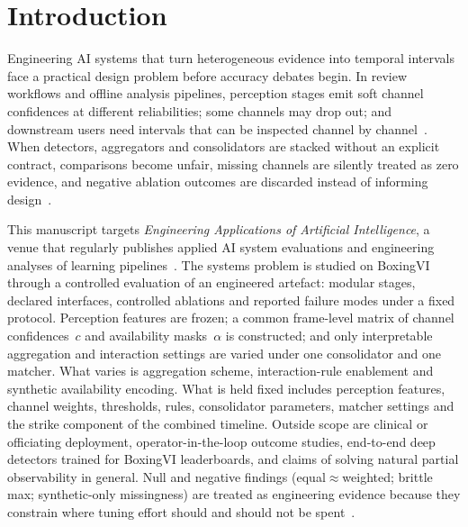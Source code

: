 \documentclass[preprint,12pt,numbers,sort&compress]{elsarticle}
\begin{document}
\section{Introduction}
\label{sec:introduction}
\label{sec:positioning}

Engineering AI systems that turn heterogeneous evidence into temporal intervals face a practical design problem before accuracy debates begin.
In review workflows and offline analysis pipelines, perception stages emit soft channel confidences at different reliabilities; some channels may drop out; and downstream users need intervals that can be inspected channel by channel~\cite{duan2019ai,doshi2017towards,rudin2019interpretable}.
When detectors, aggregators and consolidators are stacked without an explicit contract, comparisons become unfair, missing channels are silently treated as zero evidence, and negative ablation outcomes are discarded instead of informing design~\cite{pineau2021reproducibility,kapoor2023leakage}.

This manuscript targets \emph{Engineering Applications of Artificial Intelligence}, a venue that regularly publishes applied AI system evaluations and engineering analyses of learning pipelines~\cite{ganaie2022ensemble}.
The systems problem is studied on BoxingVI~\cite{kumar2025boxingvi} through a controlled evaluation of an engineered artefact: modular stages, declared interfaces, controlled ablations and reported failure modes under a fixed protocol.
Perception features are frozen; a common frame-level matrix of channel confidences~$c$ and availability masks~$\alpha$ is constructed; and only interpretable aggregation and interaction settings are varied under one consolidator and one matcher.
What varies is aggregation scheme, interaction-rule enablement and synthetic availability encoding.
What is held fixed includes perception features, channel weights, thresholds, rules, consolidator parameters, matcher settings and the strike component of the combined timeline.
Outside scope are clinical or officiating deployment, operator-in-the-loop outcome studies, end-to-end deep detectors trained for BoxingVI leaderboards, and claims of solving natural partial observability in general.
Null and negative findings (equal$\approx$weighted; brittle max; synthetic-only missingness) are treated as engineering evidence because they constrain where tuning effort should and should not be spent~\cite{lipton2018mythos,pineau2021reproducibility}.
\end{document}

